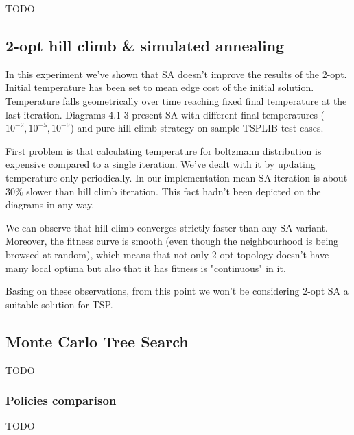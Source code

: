 TODO

\subsection { 2-opt hill climb \& simulated annealing }

In this experiment we've shown that SA doesn't improve the results of the 2-opt.
Initial temperature has been set to mean edge cost of the initial solution.
Temperature falls geometrically over time reaching fixed final temperature at the last iteration.
Diagrams 4.1-3 present SA with different final temperatures ($10^{-2}, 10^{-5}, 10^{-9}$) and
pure hill climb strategy on sample TSPLIB test cases.





First problem is that calculating temperature for boltzmann distribution is
expensive compared to a single iteration. We've dealt with it by updating temperature
only periodically. In our implementation mean SA iteration is about $30\%$ slower than
hill climb iteration. This fact hadn't been depicted on the diagrams in any way.

We can observe that hill climb converges strictly faster than any SA variant.
Moreover, the fitness curve is smooth (even though the neighbourhood is being browsed at random),
which means that not only 2-opt topology doesn't have many local optima but also that it has fitness
is "continuous" in it.

Basing on these observations, from this point we won't be considering 2-opt SA a
suitable solution for TSP.

\subsection{Monte Carlo Tree Search}

TODO %

\subsubsection{Policies comparison}

TODO %

\begin{figure}[ht]
  
\end{figure}

\begin{figure}[ht]
  
\end{figure}

\begin{figure}[ht]
  
\end{figure}
